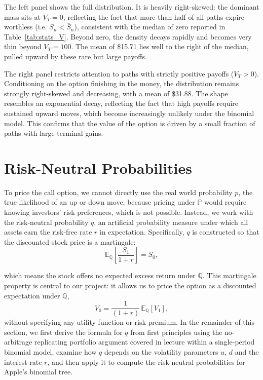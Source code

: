 \documentclass[hidelinks, 12pt, a4paper]{article}
\theoremstyle{definition}
\begin{document}
The left panel shows the full distribution. It is heavily right-skewed: the dominant mass 
sits at $V_T = 0$, reflecting the fact that more than half of all paths expire worthless 
(i.e. $S_n < \bar{S}_n$), consistent with the median of zero reported in Table~\ref{tab:stats_V}. Beyond 
zero, the density decays rapidly and becomes very thin beyond $V_T = 100$. The mean of \$15.71 lies well to the right of the 
median, pulled upward by these rare but large payoffs.

The right panel restricts attention to paths with strictly positive payoffs ($V_T > 0$). 
Conditioning on the option finishing in the money, the distribution remains strongly 
right-skewed and decreasing, with a mean of \$31.88. The shape resembles an exponential 
decay, reflecting the fact that high payoffs require sustained upward moves, which become 
increasingly unlikely under the binomial model. This confirms that the value of the option 
is driven by a small fraction of paths with large terminal gains.

\newpage


\section{Risk-Neutral Probabilities}
\label{sec:riskneutral}

To price the call option, we cannot directly use the 
real world probability $p$, the true likelihood of an up or down move, because 
pricing under $\mathbb{P}$ would require knowing investors' risk preferences, which is not possible. 
Instead, we work with the risk-neutral probability $q$, an artificial 
probability measure under which all assets earn the risk-free rate $r$ in 
expectation. Specifically, $q$ is constructed so that the discounted stock price 
is a martingale:
\begin{equation}
      \mathbb{E}_{\mathbb{Q}}\!\left[\frac{S_1}{1+r}\right] = S_0,
\end{equation}

\noindent which means the stock offers no expected excess return under $\mathbb{Q}$. 
This martingale property is central to our project: it allows us to price the 
option as a discounted expectation under $\mathbb{Q}$,
\begin{equation}
  V_0 = \frac{1}{(1+r)}\,\mathbb{E}_{\mathbb{Q}}[V_1],
  \label{get_v0}
\end{equation}
without specifying any utility function or risk premium. In the remainder of 
this section, we first derive the formula for $q$ from first principles using 
the no-arbitrage replicating portfolio argument covered in lecture within a 
single-period binomial model, examine how $q$ depends on the volatility 
parameters $u$, $d$ and the interest rate $r$, and then apply it to compute 
the risk-neutral probabilities for Apple's binomial tree.
\end{document}
